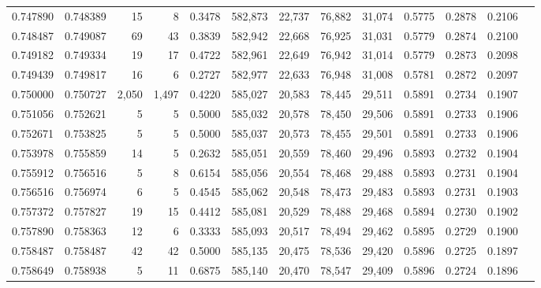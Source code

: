 \begin{tabular}{rrrrrrrrrrrrr}
0.747890 & 0.748389 &     15 &     8 &                                     0.3478 & 582,873 &  22,737 &  76,882 &  31,074 & 0.5775 & 0.2878 & 0.2106 \\
0.748487 & 0.749087 &     69 &    43 &                                     0.3839 & 582,942 &  22,668 &  76,925 &  31,031 & 0.5779 & 0.2874 & 0.2100 \\
0.749182 & 0.749334 &     19 &    17 &                                     0.4722 & 582,961 &  22,649 &  76,942 &  31,014 & 0.5779 & 0.2873 & 0.2098 \\
0.749439 & 0.749817 &     16 &     6 &                                     0.2727 & 582,977 &  22,633 &  76,948 &  31,008 & 0.5781 & 0.2872 & 0.2097 \\
0.750000 & 0.750727 &  2,050 & 1,497 &                                     0.4220 & 585,027 &  20,583 &  78,445 &  29,511 & 0.5891 & 0.2734 & 0.1907 \\
0.751056 & 0.752621 &      5 &     5 &                                     0.5000 & 585,032 &  20,578 &  78,450 &  29,506 & 0.5891 & 0.2733 & 0.1906 \\
0.752671 & 0.753825 &      5 &     5 &                                     0.5000 & 585,037 &  20,573 &  78,455 &  29,501 & 0.5891 & 0.2733 & 0.1906 \\
0.753978 & 0.755859 &     14 &     5 &                                     0.2632 & 585,051 &  20,559 &  78,460 &  29,496 & 0.5893 & 0.2732 & 0.1904 \\
0.755912 & 0.756516 &      5 &     8 &                                     0.6154 & 585,056 &  20,554 &  78,468 &  29,488 & 0.5893 & 0.2731 & 0.1904 \\
0.756516 & 0.756974 &      6 &     5 &                                     0.4545 & 585,062 &  20,548 &  78,473 &  29,483 & 0.5893 & 0.2731 & 0.1903 \\
0.757372 & 0.757827 &     19 &    15 &                                     0.4412 & 585,081 &  20,529 &  78,488 &  29,468 & 0.5894 & 0.2730 & 0.1902 \\
0.757890 & 0.758363 &     12 &     6 &                                     0.3333 & 585,093 &  20,517 &  78,494 &  29,462 & 0.5895 & 0.2729 & 0.1900 \\
0.758487 & 0.758487 &     42 &    42 &                                     0.5000 & 585,135 &  20,475 &  78,536 &  29,420 & 0.5896 & 0.2725 & 0.1897 \\
0.758649 & 0.758938 &      5 &    11 &                                     0.6875 & 585,140 &  20,470 &  78,547 &  29,409 & 0.5896 & 0.2724 & 0.1896 \\

\end{tabular}
